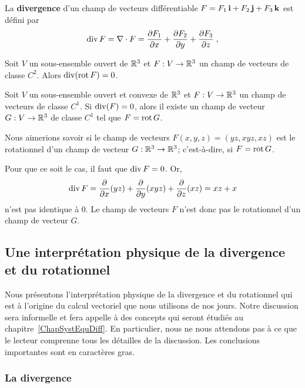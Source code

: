 {\begin{defn} 
La {\bfseries divergence} d'un champ de vecteurs différentiable
$F = F_1\,\ii + F_2\,\jj + F_3\,\kk$ est défini par
\[
\diV F =  \nabla \cdot F
= \pdydx{F_1}{x} + \pdydx{F_2}{y} + \pdydx{F_3}{z} \; ,
\]
\end{defn}

\begin{prop}
Soit $V$ un sous-ensemble ouvert de $\RR^3$ et $F:V\to \RR^3$ un
champ de vecteurs de classe $C^2$.  Alors $\diV(\curl F) = 0$.
\end{prop}

\begin{prop}
Soit $V$ un sous-ensemble ouvert et convexe de $\RR^3$ et
$F:V\to \RR^3$ un champ de vecteurs de classe $C^1$.  Si
$\diV(F) = 0$, alors il existe un champ de vecteur $G:V \to \RR^3$ de
classe $C^1$ tel que $F = \curl G$.
\end{prop}

\begin{egg}
Nous aimerions savoir si le champ de vecteurs
$F(x,y,z) = (yz, x y z, xz)$ est le rotationnel d'un champ de vecteur
$G:\RR^3 \to \RR^3$; c'est-à-dire, si $F = \curl G$.

Pour que ce soit le cas, il faut que $\diV F = 0$.  Or,
\[
  \diV F = \pdfdx{(yz)}{x} + \pdfdx{(xyz)}{y}
  + \pdfdx{(xz)}{z} = xz + x
\]
n'est pas identique à $0$.  Le champ de vecteurs $F$ n'est
donc pas le rotationnel d'un champ de vecteur $G$.
\end{egg}

\subsection{Une interprétation physique de la divergence et du
  rotationnel}

Nous présentons l'interprétation physique de la divergence et du
rotationnel qui est à l'origine du calcul vectoriel que nous utilisons de
nos jours.  Notre discussion sera informelle et fera appelle à des
concepts qui seront étudiés au chapitre~\ref{ChapSystEquDiff}.
En particulier, nous ne nous attendons pas à ce que le lecteur
comprenne tous les détailles de la discussion.  Les conclusions
importantes sont en caractères gras.

\subsubsection{La divergence}

}
